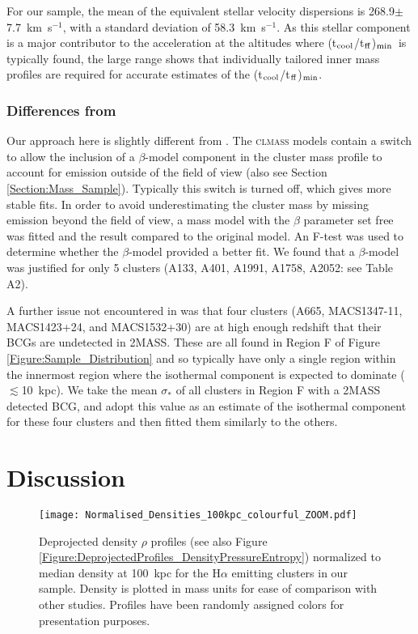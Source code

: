 \documentclass[twocolumn]{aastex6}
\newcommand{\tctff}{{t$_{\rm cool}$/t$_{\rm ff}$}}
\newcommand{\tctffmin}{(\tctff)$_{\rm min}$}
\begin{document}
For our sample, the mean of the equivalent stellar velocity dispersions is 268.9$\pm$7.7~km~s$^{-1}$, with a standard deviation of 58.3~km~s$^{-1}$.  As this stellar component is a major contributor to the acceleration at the altitudes where \tctffmin\ is typically found, the large range shows that individually tailored inner mass profiles are required for accurate estimates of the \tctffmin.

\subsubsection{Differences from \citet[][]{Hogan17}}

Our approach here is slightly different from \citet[][]{Hogan17}.  The \textsc{clmass} models contain a switch to allow the inclusion of a $\beta$-model component in the cluster mass profile to account for emission outside of the field of view (also see Section \ref{Section:Mass_Sample}).  Typically this switch is turned off, which gives more stable fits.  In order to avoid underestimating the cluster mass by missing emission beyond the field of view, a mass model with the $\beta$ parameter set free was fitted and the result compared to the original model. An F-test was used to determine whether the $\beta$-model provided a better fit.  We found that a $\beta$-model was justified for only 5 clusters (A133, A401, A1991, A1758, A2052: see Table A2).

A further issue not encountered in \citet[][]{Hogan17} was that four clusters (A665, MACS1347-11, MACS1423+24, and MACS1532+30) are at high enough redshift that their BCGs are undetected in 2MASS.  These are all found in Region F of Figure \ref{Figure:Sample_Distribution} and so typically have only a single region within the innermost region where the isothermal component is expected to dominate ($\lesssim$10~kpc).  We take the mean $\sigma_{*}$ of all clusters in Region F with a 2MASS detected BCG, and adopt this value as an estimate of the isothermal component for these four clusters and then fitted them similarly to the others.

\section{Discussion} \label{Section:Discussion}

\begin{figure}
	\texttt{[image: Normalised\_Densities\_100kpc\_colourful\_ZOOM.pdf]}
    \caption{Deprojected density $\rho$ profiles (see also Figure \ref{Figure:DeprojectedProfiles_DensityPressureEntropy}) normalized to median density at 100~kpc for the H$\alpha$ emitting clusters in our sample.  Density is plotted in mass units for ease of comparison with other studies.  Profiles have been randomly assigned colors for presentation purposes.}
    \label{Figure:Normalised_Densities}
\end{figure}
\end{document}
